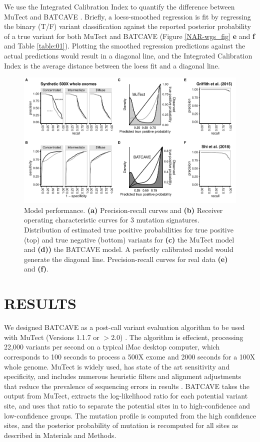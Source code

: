 \documentclass[a4,center,fleqn]{NAR}
\newcommand{\batcave}{BATCAVE }
\begin{document}
	We use the Integrated Calibration Index to quantify the difference between MuTect and \batcave \cite{Austin2019}.
	Briefly, a loess-smoothed regression is fit by regressing the binary (T/F) variant classification against the reported posterior probability of a true variant for both MuTect and \batcave (Figure \ref{NAR-wgs_fig} \textbf{e} and \textbf{f} and Table \ref{table:01}).
	Plotting the smoothed regression predictions against the actual predictions would result in a diagonal line, and the Integrated Calibration Index is the average distance between the loess fit and a diagonal line.

  \begin{figure}
    \begin{center}
    \includegraphics{figures/fig_wes.pdf}
    \end{center}
    \caption{Model performance.
    \textbf{(a)} Precision-recall curves and \textbf{(b)} Receiver operating characteristic curves for 3 mutation signatures.
    Distribution of estimated true positive probabilities for true positive (top) and true negative (bottom) variants for \textbf{(c)} the MuTect model and \textbf{(d))} the \batcave model.
    A perfectly calibrated model would generate the diagonal line. Precision-recall curves for real data \textbf{(e)} and \textbf{(f)}.}
  \label{NAR-wes_fig}
  \end{figure}

\section{RESULTS}
We designed \batcave as a post-call variant evaluation algorithm to be used with MuTect (Versions 1.1.7 or $>$2.0) \cite{Cibulskis2013}.
The algorithm is effecient, processing 22,000 variants per second on a typical iMac desktop computer, which corresponds to 100 seconds to process a 500X exome and 2000 seconds for a 100X whole genome.
MuTect is widely used, has state of the art sensitivity and specificity, and includes numerous heuristic filters and alignment adjustments that reduce the prevalence of sequencing errors in results \cite{Griffith2015}.
\batcave takes the output from MuTect, extracts the log-likelihood ratio for each potential variant site, and uses that ratio to separate the potential sites in to high-confidence and low-confidence groups.
The mutation profile is computed from the high confidence sites, and the posterior probability of mutation is recomputed for all sites as described in Materials and Methods.
\end{document}
